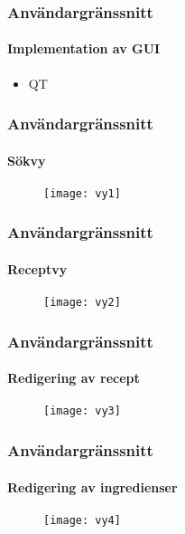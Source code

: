 \begin{frame}
  \frametitle{Användargränssnitt}
  \framesubtitle{Implementation av GUI}
  \begin{itemize}
  \item QT
  \end{itemize}
\end{frame}

\begin{frame}
  \frametitle{Användargränssnitt}
  \framesubtitle{Sökvy}
  \begin{figure}
    \texttt{[image: vy1]}
  \end{figure}
\end{frame}

\begin{frame}
  \frametitle{Användargränssnitt}
  \framesubtitle{Receptvy}
  \begin{figure}
    \texttt{[image: vy2]}
  \end{figure}
\end{frame}

\begin{frame}
  \frametitle{Användargränssnitt}
  \framesubtitle{Redigering av recept}
  \begin{figure}
    \texttt{[image: vy3]}
  \end{figure}
\end{frame}

\begin{frame}
  \frametitle{Användargränssnitt}
  \framesubtitle{Redigering av ingredienser}
  \begin{figure}
    \texttt{[image: vy4]}
  \end{figure}
\end{frame}


